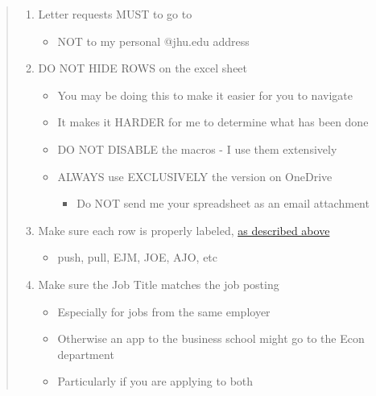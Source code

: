 \documentclass{\econtex}
\begin{document}
\begin{quote}
  \begin{enumerate}
  \item Letter requests MUST to go to \jmstaffemail
    \begin{itemize}
    \item NOT to my personal @jhu.edu address
    \end{itemize}
  \item DO NOT HIDE ROWS on the excel sheet
    \begin{itemize}
    \item You may be doing this to make it easier for you to navigate
    \item It makes it HARDER for me to determine what has been done
    \item DO NOT DISABLE the macros - I use them extensively
    \item ALWAYS use EXCLUSIVELY the version on OneDrive
      \begin{itemize}
      \item Do NOT send me your spreadsheet as an email attachment
      \end{itemize}
    \end{itemize}
  \item Make sure each row is properly labeled, \href{\pageurl/RecLetters/#students-and-staff}{as described above}
    \begin{itemize}
    \item push, pull, EJM, JOE, AJO, etc
    \end{itemize}
  \item Make sure the Job Title matches the job posting
    \begin{itemize}
    \item Especially for jobs from the same employer
    \item Otherwise an app to the business school might go to the Econ department
    \item Particularly if you are applying to both
    \end{itemize}
  \end{enumerate}
\end{quote}

\end{document}
